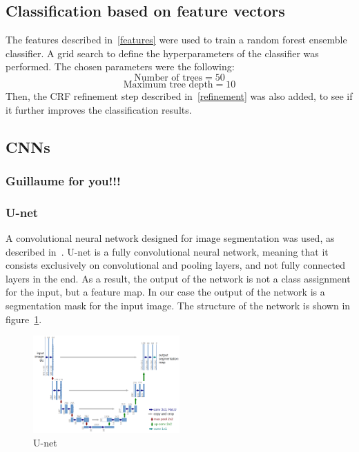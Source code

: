 \documentclass[10pt,conference,compsocconf]{IEEEtran}
\begin{document}
	\subsection{Classification based on feature vectors}
	The features described in~\ref{features} were used to train a random forest ensemble classifier. A grid search to define the hyperparameters of the classifier was performed. The chosen parameters were the following:
	$$\text{Number of trees} = 50$$
	$$\text{Maximum tree depth} = 10$$
	Then, the CRF refinement step described in~\ref{refinement} was also added, to see if it further improves the classification results.
	\subsection{CNNs}
	\subsubsection{Guillaume for you!!!}
	\subsubsection{U-net}
	A convolutional neural network designed for image segmentation was used, as described in~\cite{unet}. U-net is a fully convolutional neural network, meaning that it consists exclusively on convolutional and pooling layers, and not fully connected layers in the end. As a result, the output of the network is not a class assignment for the input, but a feature map. In our case the output of the network is a segmentation mask for the input image. The structure of the network is shown in figure~\ref{unet_arch}.
		\begin{figure}[h]
			\centering
			\includegraphics[width=0.5\textwidth]{unet.png}
			\caption{U-net~\cite{unet}}
			\label{unet_arch}
		\end{figure}
\end{document}
